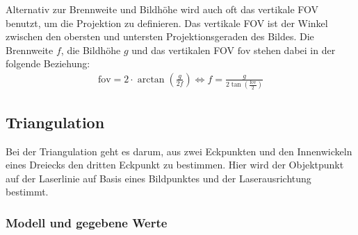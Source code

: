 \documentclass[ngerman,a4paper,parskip=half]{scrartcl}
\def \fov{\mathrm{fov}}
\begin{document}
Alternativ zur Brennweite und Bildhöhe wird auch oft das vertikale \ac{FOV} benutzt, um die Projektion zu definieren. Das vertikale \ac{FOV} ist der Winkel zwischen den obersten und untersten Projektionsgeraden des Bildes. Die Brennweite $f$, die Bildhöhe $g$ und das vertikalen \ac{FOV} $\fov$ stehen dabei in der folgende Beziehung:
\begin{align*}
	\fov = 2 \cdot \arctan \left( \frac{g}{2 f} \right)
	\Leftrightarrow f = \frac{g}{2 \tan\left(\frac{\fov}{2}\right)}
\end{align*}

\subsection{Triangulation}

Bei der Triangulation geht es darum, aus zwei Eckpunkten und den Innenwickeln eines Dreiecks den dritten Eckpunkt zu bestimmen. Hier wird der Objektpunkt auf der Laserlinie auf Basis eines Bildpunktes und der Laserausrichtung bestimmt.

\subsubsection{Modell und gegebene Werte}
\end{document}
